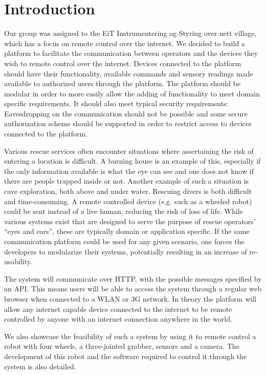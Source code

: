 \chapter{Introduction}
Our group was assigned to the EiT Instrumentering og Styring over nett village, which has a focus on remote control over the internet.
We decided to build a platform to facilitate the communication between operators and the devices they wish to remote control over the internet.
Devices connected to the platform should have their functionality, available commands and sensory readings made available to authorized users through the platform.
The platform should be modular in order to more easily allow the adding of functionality to meet domain specific requirements.
It should also meet typical security requirements: Eavesdropping on the communication should not be possible and some secure authorization scheme should be supported in order to restrict access to devices connected to the platform.

Various rescue services often encounter situations where assertaining the risk of entering a location is difficult. A burning house is an example of this, especially if the only information available is what the eye can see and one does not know if there are people trapped inside or not.
Another example of such a situation is cave exploration, both above and under water.
Rescuing divers is both difficult and time-consuming.  %
A remote controlled device (e.g. such as a wheeled robot) could be sent instead of a live human, reducing the risk of loss of life.
While various systems exist that are designed to serve the purpose of rescue operators' ``eyes and ears'', these are typically domain or application specific.
If the same communication platform could be used for any given scenario, one forces the developers to modularize their systems, potentially resulting in an increase of re-usability.


The system will communicate over HTTP, with the possible messages specified by an API.
This means users will be able to access the system through a regular web browser when connected to a WLAN or 3G network.
In theory the platform will allow any internet capable device connected to the internet to be remote controlled by anyone with an internet connection anywhere in the world.

We also showcase the feasibility of such a system by using it to remote control a robot with four wheels, a three-jointed grabber, sensors and a camera.
The development of this robot and the software required to control it through the system is also detailed.
